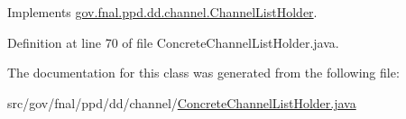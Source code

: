 Implements \hyperlink{interfacegov_1_1fnal_1_1ppd_1_1dd_1_1channel_1_1ChannelListHolder_a9e2d59130d1583a9eaa93840ba1c4004}{gov.\-fnal.\-ppd.\-dd.\-channel.\-Channel\-List\-Holder}.



Definition at line 70 of file Concrete\-Channel\-List\-Holder.\-java.



The documentation for this class was generated from the following file\-:\begin{DoxyCompactItemize}
\item 
src/gov/fnal/ppd/dd/channel/\hyperlink{ConcreteChannelListHolder_8java}{Concrete\-Channel\-List\-Holder.\-java}\end{DoxyCompactItemize}
